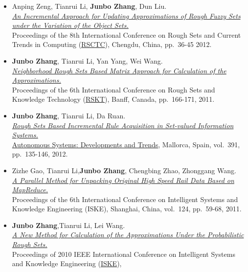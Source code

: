 \documentclass[]{article}
\begin{document}
\begin{itemize}
\item
  Anping Zeng, Tianrui Li, \textbf{Junbo Zhang}, Dun Liu.\\
  \href{http://dx.doi.org/10.1007/978-3-642-32115-3_4}{\emph{An
  Incremental Approach for Updating Approximations of Rough Fuzzy Sets
  under the Variation of the Object Sets.}}\\ Proceedings of the 8th
  International Conference on Rough Sets and Current Trends in Computing
  (\href{http://www.informatik.uni-trier.de/~ley/db/conf/rsctc/index.html}{RSCTC}),
  Chengdu, China, pp.~36-45 2012.
\item
  \textbf{Junbo Zhang}, Tianrui Li, Yan Yang, Wei Wang.\\
  \href{http://dx.doi.org/10.1007/978-3-642-24425-4_23}{\emph{Neighborhood
  Rough Sets Based Matrix Approach for Calculation of the
  Approximations.}}\\ Proceedings of the 6th International Conference on
  Rough Sets and Knowledge Technology
  (\href{http://rskt.cs.uregina.ca}{RSKT}), Banff, Canada, pp.~166-171,
  2011.
\item
  \textbf{Junbo Zhang}, Tianrui Li, Da Ruan.\\
  \href{http://dx.doi.org/10.1007/978-3-642-24806-1_11}{\emph{Rough Sets
  Based Incremental Rule Acquisition in Set-valued Information
  Systems.}}\\
  \href{http://www.fernuni-hagen.de/kn/phdseminar11/index_en.html}{Autonomous
  Systems: Developments and Trends}, Mallorca, Spain, vol.~391,
  pp.~135-146, 2012.
\item
  Zizhe Gao, Tianrui Li,\textbf{Junbo Zhang}, Chengbing Zhao, Zhonggang
  Wang.\\ \href{http://dx.doi.org/10.1007/978-3-642-25658-5_8}{\emph{A
  Parallel Method for Unpacking Original High Speed Rail Data Based on
  MapReduce.}}\\ Proceedings of the 6th International Conference on
  Intelligent Systems and Knowledge Engineering (ISKE), Shanghai, China,
  vol.~124, pp.~59-68, 2011.
\item
  \textbf{Junbo Zhang},Tianrui Li, Lei Wang.\\
  \href{http://dx.doi.org/10.1109/ISKE.2010.5680797}{\emph{A New Method
  for Calculation of the Approximations Under the Probabilistic Rough
  Sets.}}\\ Proceedings of 2010 IEEE International Conference on
  Intelligent Systems and Knowledge Engineering
  (\href{http://ieeexplore.ieee.org/xpl/mostRecentIssue.jsp?punumber=5676709}{ISKE}),

\end{itemize}
\end{document}
